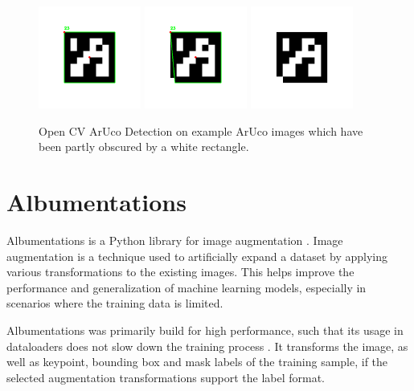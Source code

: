 \documentclass[10pt]{book}
\begin{document}
\begin{figure}
  \centering
     {\includegraphics[width=0.3\textwidth]{image/rec}}
     {\includegraphics[width=0.3\textwidth]{image/skewed-rec}}
     {\includegraphics[width=0.3\textwidth]{image/no-rec}}
  \caption{Open CV ArUco Detection on example \ac{ArUco} images which have been partly obscured by a white rectangle.}
  \label{fig:aruco-det}
\end{figure}

\section{Albumentations}

Albumentations is a Python library for image augmentation \cite{info11020125}. Image augmentation is a technique used to artificially expand a dataset by applying various transformations to the existing images. This helps improve the performance and generalization of machine learning models, especially in scenarios where the training data is limited. 

Albumentations was primarily build for high performance, such that its usage in dataloaders does not slow down the training process \cite{info11020125}. It transforms the image, as well as keypoint, bounding box and mask labels of the training sample, if the selected augmentation transformations support the label format. 
\end{document}
